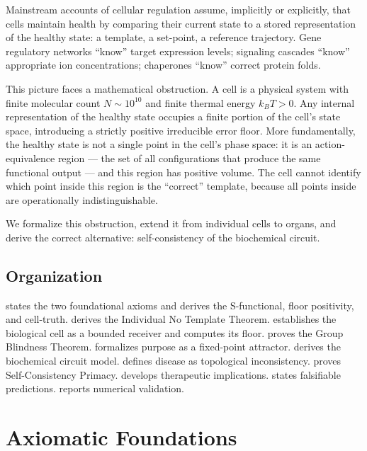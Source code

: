 \documentclass[twocolumn,11pt,a4paper]{article}
\begin{document}
Mainstream accounts of cellular regulation assume, implicitly or explicitly,
that cells maintain health by comparing their current state to a stored
representation of the healthy state: a template, a set-point, a reference
trajectory. Gene regulatory networks ``know'' target expression levels;
signaling cascades ``know'' appropriate ion concentrations; chaperones
``know'' correct protein folds.

This picture faces a mathematical obstruction. A cell is a physical system
with finite molecular count $N \sim 10^{10}$ and finite thermal energy
$k_B T > 0$. Any internal representation of the healthy state occupies a
finite portion of the cell's state space, introducing a strictly positive
irreducible error floor. More fundamentally, the healthy state is not a
single point in the cell's phase space: it is an action-equivalence region
--- the set of all configurations that produce the same functional output
--- and this region has positive volume. The cell cannot identify which
point inside this region is the ``correct'' template, because all points
inside are operationally indistinguishable.

We formalize this obstruction, extend it from individual cells to organs, and
derive the correct alternative: self-consistency of the biochemical circuit.

\subsection{Organization}

 states the two foundational axioms and derives the
S-functional, floor positivity, and cell-truth.
 derives the Individual No Template Theorem.
 establishes the biological cell as a bounded receiver
and computes its floor.
 proves the Group Blindness Theorem.
 formalizes purpose as a fixed-point attractor.
 derives the biochemical circuit model.
 defines disease as topological inconsistency.
 proves Self-Consistency Primacy.
 develops therapeutic implications.
 states falsifiable predictions.
 reports numerical validation.

\section{Axiomatic Foundations}
\label{sec:axioms}
\end{document}
